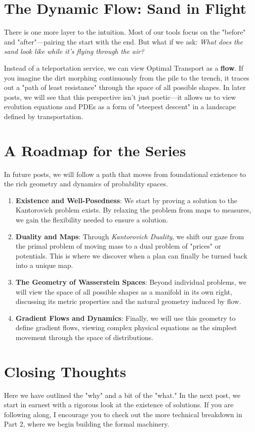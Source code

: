 \documentclass[
	a4paper,
	DIV=13,
	abstract=true,
	numbers=noenddot
]{scrartcl}
\begin{document}
\section{The Dynamic Flow: Sand in Flight}
There is one more layer to the intuition. Most of our tools focus on the "before" and "after"—pairing the start with the end. But what if we ask: \emph{What does the sand look like while it’s flying through the air?}

Instead of a teleportation service, we can view Optimal Transport as a \textbf{flow}. If you imagine the dirt morphing continuously from the pile to the trench, it traces out a "path of least resistance" through the space of all possible shapes. In later posts, we will see that this perspective isn't just poetic—it allows us to view evolution equations and PDEs as a form of "steepest descent" in a landscape defined by transportation.

\section{A Roadmap for the Series}
In future posts, we will follow a path that moves from foundational existence to the rich geometry and dynamics of probability spaces.

\begin{enumerate}
    \item \textbf{Existence and Well-Posedness}: We start by proving a solution to the Kantorovich problem exists. By relaxing the problem from maps to measures, we gain the flexibility needed to ensure a solution.
    
    \item \textbf{Duality and Maps}: Through \emph{Kantorovich Duality}, we shift our gaze from the primal problem of moving mass to a dual problem of "prices" or potentials. This is where we discover when a plan can finally be turned back into a unique map.
    
    \item \textbf{The Geometry of Wasserstein Spaces}: Beyond individual problems, we will view the space of all possible shapes as a manifold in its own right, discussing its metric properties and the natural geometry induced by flow.
    
    \item \textbf{Gradient Flows and Dynamics}: Finally, we will use this geometry to define gradient flows, viewing complex physical equations as the simplest movement through the space of distributions.
\end{enumerate}

\section{Closing Thoughts}
Here we have outlined the "why" and a bit of the "what." In the next post, we start in earnest with a rigorous look at the existence of solutions. If you are following along, I encourage you to check out the more technical breakdown in Part 2, where we begin building the formal machinery.



\end{document}
